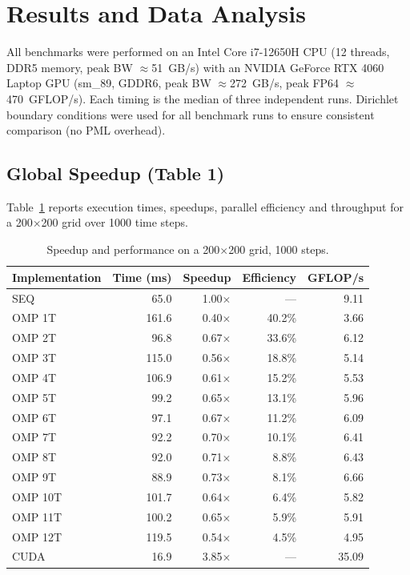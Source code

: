 \documentclass[12pt,a4paper]{article}
\begin{document}
\section{Results and Data Analysis}
\label{sec:results}

All benchmarks were performed on an Intel Core i7-12650H CPU
(12 threads, DDR5 memory, peak BW $\approx$51~GB/s) with an
NVIDIA GeForce RTX 4060 Laptop GPU (sm\_89, GDDR6,
peak BW $\approx$272~GB/s, peak FP64 $\approx$470~GFLOP/s).
Each timing is the median of three independent runs.
Dirichlet boundary conditions were used for all benchmark runs to
ensure consistent comparison (no PML overhead).

\subsection{Global Speedup (Table 1)}

Table~\ref{tab:speedup} reports execution times, speedups, parallel
efficiency and throughput for a 200$\times$200 grid over 1000 time steps.

\begin{table}[H]
\centering
\caption{Speedup and performance on a 200$\times$200 grid, 1000 steps.}
\label{tab:speedup}
\begin{tabular}{lrrrr}
\toprule
Implementation & Time (ms) & Speedup & Efficiency & GFLOP/s \\
\midrule
SEQ            &  65.0 & 1.00$\times$ &   —     &  9.11 \\
\midrule
OMP 1T         & 161.6 & 0.40$\times$ & 40.2\%  &  3.66 \\
OMP 2T         &  96.8 & 0.67$\times$ & 33.6\%  &  6.12 \\
OMP 3T         & 115.0 & 0.56$\times$ & 18.8\%  &  5.14 \\
OMP 4T         & 106.9 & 0.61$\times$ & 15.2\%  &  5.53 \\
OMP 5T         &  99.2 & 0.65$\times$ & 13.1\%  &  5.96 \\
OMP 6T         &  97.1 & 0.67$\times$ & 11.2\%  &  6.09 \\
OMP 7T         &  92.2 & 0.70$\times$ & 10.1\%  &  6.41 \\
OMP 8T         &  92.0 & 0.71$\times$ &  8.8\%  &  6.43 \\
OMP 9T         &  88.9 & 0.73$\times$ &  8.1\%  &  6.66 \\
OMP 10T        & 101.7 & 0.64$\times$ &  6.4\%  &  5.82 \\
OMP 11T        & 100.2 & 0.65$\times$ &  5.9\%  &  5.91 \\
OMP 12T        & 119.5 & 0.54$\times$ &  4.5\%  &  4.95 \\
\midrule
CUDA           &  16.9 & 3.85$\times$ &   —     & 35.09 \\
\bottomrule
\end{tabular}
\end{table}
\end{document}
